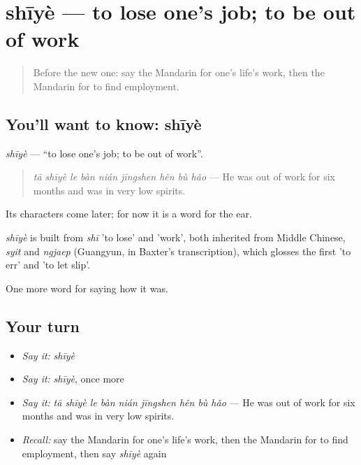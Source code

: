 \section[shīyè]{shīyè — to lose one's job; to be out of work}

\label{lesson:ZH-C487-shiye-jobless}



\begin{quote}
Before the new one: say the Mandarin for one's life's work, then the Mandarin for to find employment.
\end{quote}

\subsection*{You'll want to know: shīyè}
\emph{shīyè} — \textquotedblleft{}to lose one's job; to be out of work\textquotedblright{}.

\begin{quote}
\emph{tā shīyè le bàn nián jīngshen hěn bù hǎo} — He was out of work for six months and was in very low spirits.
\end{quote}

Its characters come later; for now it is a word for the ear.

\begin{cousinweb}
\emph{shīyè} is built from \emph{shī} 'to lose' and  'work', both inherited from Middle Chinese, \emph{syit} and \emph{ngjaep} (Guangyun, in Baxter's transcription), which glosses the first 'to err' and 'to let slip'.
\end{cousinweb}

\begin{grammarlens}[title={What you've built}]
One more word for saying how it was.
\end{grammarlens}

\subsection*{Your turn}
\begin{itemize}
\raggedright
  \item \emph{Say it:} \emph{shīyè}
  \item \emph{Say it:} \emph{shīyè}, once more
  \item \emph{Say it:} \emph{tā shīyè le bàn nián jīngshen hěn bù hǎo} — He was out of work for six months and was in very low spirits.
  \item \emph{Recall:} say the Mandarin for one's life's work, then the Mandarin for to find employment, then say \emph{shīyè} again
\end{itemize}

